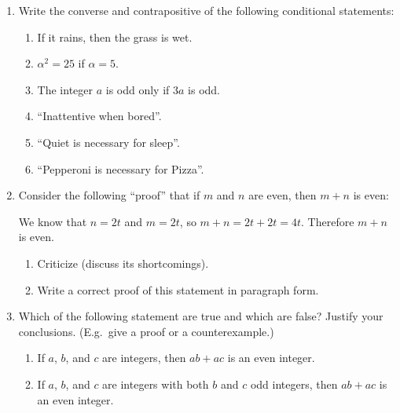 \documentclass[12pt]{article}
\begin{document}
\begin{enumerate}  %


\item Write the converse and contrapositive of the following conditional statements:
  \begin{enumerate}
    \item If it rains, then the grass is wet.
    \item $\alpha^2=25$ if $\alpha=5$.
    \item The integer $a$ is odd only if $3a$ is odd.
    \item ``Inattentive when bored''.
    \item ``Quiet is necessary for sleep''.
    \item ``Pepperoni is necessary for Pizza''.
  \end{enumerate}


\item  Consider the following   ``proof'' that if $m$ and $n$ are even, then $m{+}n$ is even:

  We know that $n=2t$ and $m=2t$, so $m{+}n=2t+2t= 4t$.  Therefore $m{+}n$ is even.


  \begin{enumerate}
   \item   Criticize (discuss its shortcomings).
  
    \item  Write a  correct proof of this statement in paragraph form.
  \end{enumerate}



\item
  Which of the following statement are true and which are false?  Justify your conclusions.  (E.g.\ give a proof or a counterexample.)
  
 \begin{enumerate}
   \item
     If $a$, $b$, and $c$ are integers, then $ab + ac$ is an even integer.
   \item
     If  $a$, $b$, and $c$ are integers with both  $b$ and $c$ odd integers, then $ab + ac$ is an even integer.
 \end{enumerate}


\end{enumerate}
\end{document}
